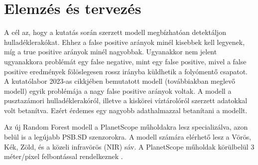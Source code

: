 \chapter{Elemzés és tervezés}
\label{ch:spec}

A cél az, hogy a kutatás során szerzett modell megbízhatóan detektáljon hulladéklerakókat. Ehhez a false positive arányok minél kisebbek kell legyenek, míg a true positive arányok minél nagyobbak. Ugyanakkor nem jelent ugyanakkora problémát egy false negative, mint egy false positive, mivel a false positive eredmények fölöslegesen rossz irányba küldhetik a folyómentő csapatot. 
A kutatólabor 2023-as cikkjében bemutatott modell (továbbiakban meglevő modell) egyik problémája a nagy false positive arányok voltak. A modell a pusztazámori hulladéklerakóról, illetve a kiskörei víztárolóról szerzett adatokkal volt betanítva. Ezért érdemes egy nagyobb adathalmazzal betanítani a modellt.

Az új Random Forest modell a PlanetScope műholdakra lesz specializálva, azon belül is a legújabb PSB.SD szenzorokra. A modell számára elérhető lesz a Vörös, Kék, Zöld, és a közeli infravörös (NIR) sáv. A PlanetScope műholdak körülbelül 3 méter/pixel felbontással rendelkeznek \cite{planetsensors2024,planetresolution2024}.